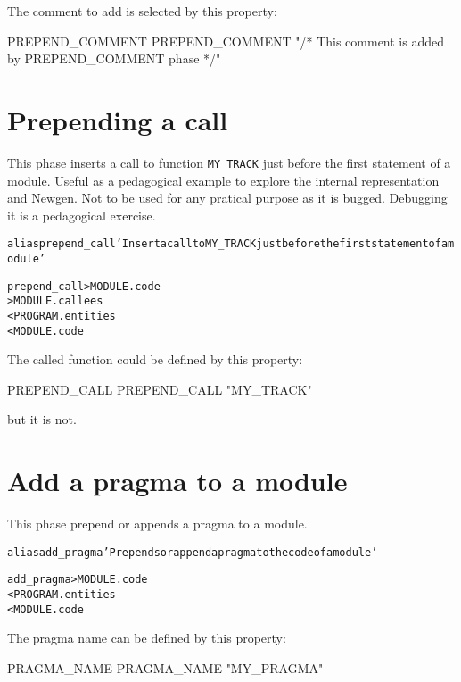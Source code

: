 \documentclass[a4paper]{report}
\newenvironment{PipsMake}{\begin{alltt}}{\end{alltt}}
\newenvironment{PipsPass}[1]{\label{pass:#1}}{}
\begin{document}
The comment to add is selected by this property:
\begin{PipsProp}{PREPEND_COMMENT}
PREPEND_COMMENT "/* This comment is added by PREPEND_COMMENT phase */"
\end{PipsProp}

\section{Prepending a call}
\label{sec:prepending-call}

\begin{PipsPass}{prepend_call}
This phase inserts a call to function \verb/MY_TRACK/ just before the first statement of a module.
Useful as a pedagogical example to explore the internal representation
and Newgen. Not to be used for any pratical purpose as it is
bugged. Debugging it is a pedagogical exercise.
\end{PipsPass}

\begin{PipsMake}
alias prepend_call 'Insert a call to MY_TRACK just before the first statement of a module'

prepend_call > MODULE.code
             > MODULE.callees
  < PROGRAM.entities
  < MODULE.code
\end{PipsMake}

The called function could be defined by this property:
\begin{PipsProp}{PREPEND_CALL}
PREPEND_CALL "MY_TRACK"
\end{PipsProp}
but it is not.

\section{Add a pragma to a module}
\label{sec:add-pragma}

\begin{PipsPass}{add_pragma}
This phase prepend or appends a pragma to a module.
\end{PipsPass}

\begin{PipsMake}
alias add_pragma 'Prepends or append a pragma to the code of a module'

add_pragma > MODULE.code
  < PROGRAM.entities
  < MODULE.code
\end{PipsMake}

The pragma name can be defined by this property:
\begin{PipsProp}{PRAGMA_NAME}
PRAGMA_NAME "MY_PRAGMA"
\end{PipsProp}
\end{document}
